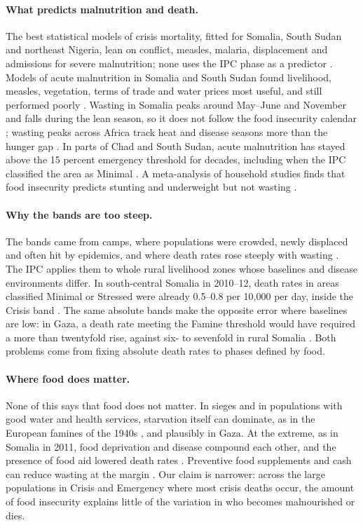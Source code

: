 \documentclass[11pt]{article}
\begin{document}
\paragraph{What predicts malnutrition and death.} The best statistical models of crisis mortality, fitted for Somalia, South Sudan and northeast Nigeria, lean on conflict, measles, malaria, displacement and admissions for severe malnutrition; none uses the IPC phase as a predictor \citep{Checchi2022SAE,checchi2023nigeria}. Models of acute malnutrition in Somalia and South Sudan found livelihood, measles, vegetation, terms of trade and water prices most useful, and still performed poorly \citep{checchi2022malnut}. Wasting in Somalia peaks around May--June and November and falls during the lean season, so it does not follow the food insecurity calendar \citep{luc2024fex}; wasting peaks across Africa track heat and disease seasons more than the hunger gap \citep{venkat2023seasonality}. In parts of Chad and South Sudan, acute malnutrition has stayed above the 15 percent emergency threshold for decades, including when the IPC classified the area as Minimal \citep{youngmarshak2017}. A meta-analysis of household studies finds that food insecurity predicts stunting and underweight but not wasting \citep{moradi2019}.

\paragraph{Why the bands are too steep.} The bands came from camps, where populations were crowded, newly displaced and often hit by epidemics, and where death rates rose steeply with wasting \citep{youngjaspars2009}. The IPC applies them to whole rural livelihood zones whose baselines and disease environments differ. In south-central Somalia in 2010--12, death rates in areas classified Minimal or Stressed were already 0.5--0.8 per 10,000 per day, inside the Crisis band \citep{checchi2013}. The same absolute bands make the opposite error where baselines are low: in Gaza, a death rate meeting the Famine threshold would have required a more than twentyfold rise, against six- to sevenfold in rural Somalia \citep{deZwarte2026Lancet}. Both problems come from fixing absolute death rates to phases defined by food.

\paragraph{Where food does matter.} None of this says that food does not matter. In sieges and in populations with good water and health services, starvation itself can dominate, as in the European famines of the 1940s \citep{mokyr2002}, and plausibly in Gaza. At the extreme, as in Somalia in 2011, food deprivation and disease compound each other, and the presence of food aid lowered death rates \citep{checchi2013}. Preventive food supplements and cash can reduce wasting at the margin \citep{isanaka2009rutf,langendorf2014preventing}. Our claim is narrower: across the large populations in Crisis and Emergency where most crisis deaths occur, the amount of food insecurity explains little of the variation in who becomes malnourished or dies.
\end{document}
